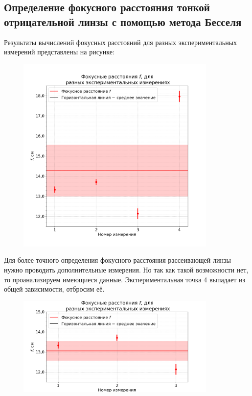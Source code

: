 \subsection*{Определение фокусного расстояния тонкой отрицательной линзы с помощью метода Бесселя}

Результаты вычислений фокусных расстояний для разных экспериментальных измерений представлены на рисунке:

\begin{figure}[H]
	\centering
	\includegraphics[width=0.88\textwidth]{../Графики/otr_full_f.png}
\end{figure}

Для более точного определения фокусного расстояния рассеивающей линзы нужно проводить дополнительные измерения. Но так как такой возможности нет, то проанализируем имеющиеся данные. Экспериментальная точка 4 выпадает из общей зависимости, отбросим её.

\begin{figure}[H]
	\centering
	\includegraphics[width=0.88\textwidth]{../Графики/otr_f.png}
\end{figure}

